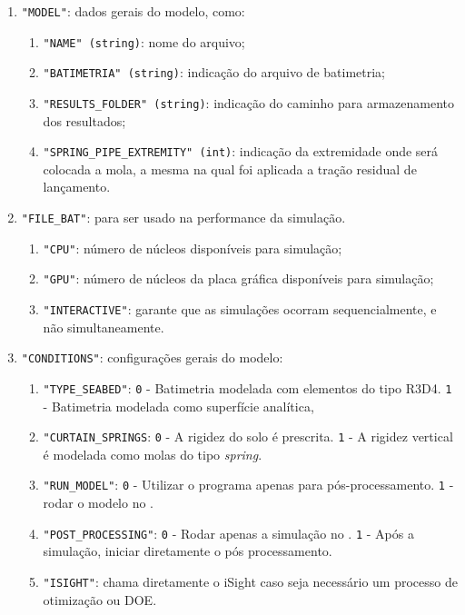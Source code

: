 \begin{enumerate}
    \item \texttt{"MODEL"}: dados gerais do modelo, como:
    \begin{enumerate}
        \item \texttt{"NAME" (string)}: nome do arquivo;
        \item \texttt{"BATIMETRIA"  (string)}: indicação do arquivo de batimetria;
        \item \texttt{"RESULTS\_FOLDER"  (string)}: indicação do caminho para armazenamento dos resultados;
        \item \texttt{"SPRING\_PIPE\_EXTREMITY" (int)}: indicação da extremidade onde será colocada a mola, a mesma na qual foi aplicada a tração residual de lançamento.
    \end{enumerate}
    \item \texttt{"FILE\_BAT"}: para ser usado na performance da simulação.
    \begin{enumerate}
        \item \texttt{"CPU"}: número de núcleos disponíveis para simulação;
        \item \texttt{"GPU"}: número de núcleos da placa gráfica disponíveis para simulação;
        \item \texttt{"INTERACTIVE"}: garante que as simulações ocorram sequencialmente, e não simultaneamente.
    \end{enumerate}
    \item \texttt{"CONDITIONS"}: configurações gerais do modelo:
    \begin{enumerate}
        \item \texttt{"TYPE\_SEABED"}: \texttt{0} - Batimetria modelada com elementos do tipo R3D4. \texttt{1} - Batimetria modelada como superfície analítica,
        \item  \texttt{"CURTAIN\_SPRINGS}: \texttt{0} - A rigidez do solo é prescrita. \texttt{1} - A rigidez vertical é modelada como molas do tipo \textit{spring}.
        \item \texttt{"RUN\_MODEL"}: \texttt{0} - Utilizar o programa apenas para pós-processamento. \texttt{1} - rodar o modelo no \abaqus.
        \item \texttt{"POST\_PROCESSING"}: \texttt{0} - Rodar apenas a simulação no \abaqus. \texttt{1} - Após a simulação, iniciar diretamente o pós processamento.
        \item \texttt{"ISIGHT"}: chama diretamente o iSight caso seja necessário um processo de otimização ou DOE.

\end{enumerate}
\end{enumerate}
